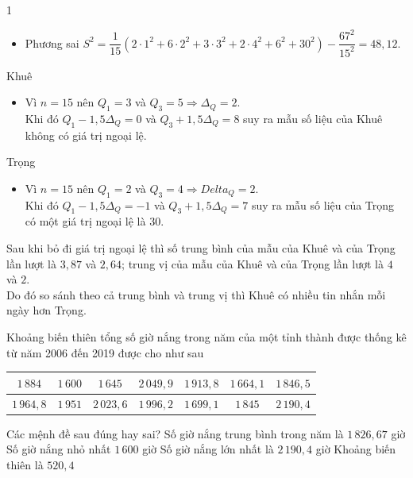 \begin{bt}
{\begin{enumEX}[a)]{1}
\begin{itemize}
				\item Phương sai  $S^2=\dfrac{1}{15}\left(2\cdot 1^2+6\cdot 2^2+3\cdot 3^2+2\cdot 4^2+6^2+30^2\right)-\dfrac{67^2}{15^2}=48{,}12$.
			\end{itemize}
			\item Khuê
			\begin{itemize}
				\item Vì $n=15$ nên $Q_1=3$ và $Q_3=5\Rightarrow \Delta_Q=2$.\\
				Khi đó $Q_1-1{,}5\Delta_Q=0$ và $Q_3+1{,}5 \Delta_Q=8$ suy ra mẫu số liệu của Khuê không có giá trị ngoại lệ.
			\end{itemize}
			Trọng
			\begin{itemize}
				\item Vì $n=15$ nên $Q_1=2$ và $Q_3=4\Rightarrow Delta_Q=2$.\\
				Khi đó $Q_1-1{,}5\Delta_Q=-1$ và $Q_3+1{,}5 \Delta_Q=7$ suy ra mẫu số liệu của Trọng có một giá trị ngoại lệ là $30$.
			\end{itemize}
			Sau khi bỏ đi giá trị ngoại lệ thì số trung bình của mẫu của Khuê và của Trọng lần lượt là $3{,}87$ và $2{,}64$; trung vị của mẫu của Khuê và của Trọng lần lượt là $4$ và $2$. \\
			Do đó so sánh theo cả trung bình và trung vị thì Khuê có nhiều tin nhắn mỗi ngày hơn Trọng.
		\end{enumEX}
	}
\end{bt}

\begin{ex}%
	Khoảng biến thiên tổng số giờ nắng trong năm của một tỉnh thành được thống kê từ năm 2006 đến 2019 được cho như sau
	\begin{center}
		\begin{tabular}{|c|c|c|c|c|c|c|}
			\hline $1 \, 884$ & $1\, 600$ & $1\, 645$ & $2\, 049{,}9$ & $1\, 913{,}8$ & $1\, 664{,}1$ & $1\, 846{,}5$  \\
			\hline $1\, 964{,}8$ & $1\, 951$ & $2\, 023{,}6$ & $1\, 996{,}2$ & $1\, 699{,}1$ & $1\, 845$ & $2\, 190{,}4$ \\
			\hline 
	\end{tabular}
	\end{center}
	Các mệnh đề sau đúng hay sai?
	\choiceTF
	{Số giờ nắng trung bình trong năm là $1\, 826{,}67$ giờ}
	{\True Số giờ nắng nhỏ nhất $1\, 600$ giờ}
	{\True Số giờ nắng lớn nhất là $2\, 190{,}4$ giờ}
	{Khoảng biến thiên là $520{,}4$}
\end{ex}

